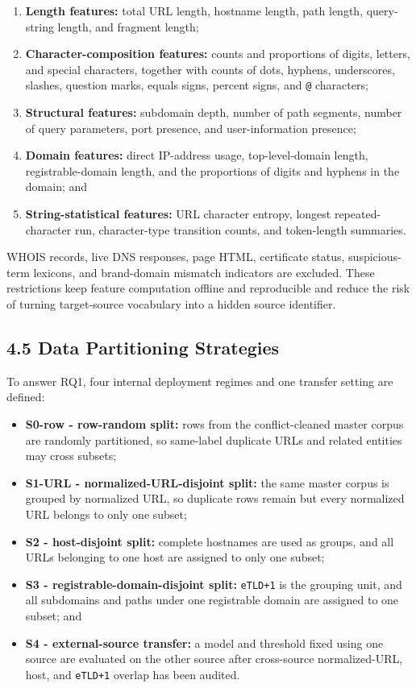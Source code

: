 \documentclass[
  10pt,
]{article}
\providecommand{\tightlist}{%
  \setlength{\itemsep}{0pt}\setlength{\parskip}{0pt}}
\begin{document}
\begin{enumerate}
\def\labelenumi{\arabic{enumi}.}
\tightlist
\item
  \textbf{Length features:} total URL length, hostname length, path
  length, query-string length, and fragment length;
\item
  \textbf{Character-composition features:} counts and proportions of
  digits, letters, and special characters, together with counts of dots,
  hyphens, underscores, slashes, question marks, equals signs, percent
  signs, and \texttt{@} characters;
\item
  \textbf{Structural features:} subdomain depth, number of path
  segments, number of query parameters, port presence, and
  user-information presence;
\item
  \textbf{Domain features:} direct IP-address usage, top-level-domain
  length, registrable-domain length, and the proportions of digits and
  hyphens in the domain; and
\item
  \textbf{String-statistical features:} URL character entropy, longest
  repeated-character run, character-type transition counts, and
  token-length summaries.
\end{enumerate}

WHOIS records, live DNS responses, page HTML, certificate status,
suspicious-term lexicons, and brand-domain mismatch indicators are
excluded. These restrictions keep feature computation offline and
reproducible and reduce the risk of turning target-source vocabulary
into a hidden source identifier.

\subsection{4.5 Data Partitioning
Strategies}\label{data-partitioning-strategies}

To answer RQ1, four internal deployment regimes and one transfer setting
are defined:

\begin{itemize}
\tightlist
\item
  \textbf{S0-row - row-random split:} rows from the conflict-cleaned
  master corpus are randomly partitioned, so same-label duplicate URLs
  and related entities may cross subsets;
\item
  \textbf{S1-URL - normalized-URL-disjoint split:} the same master
  corpus is grouped by normalized URL, so duplicate rows remain but
  every normalized URL belongs to only one subset;
\item
  \textbf{S2 - host-disjoint split:} complete hostnames are used as
  groups, and all URLs belonging to one host are assigned to only one
  subset;
\item
  \textbf{S3 - registrable-domain-disjoint split:} \texttt{eTLD+1} is
  the grouping unit, and all subdomains and paths under one registrable
  domain are assigned to one subset; and
\item
  \textbf{S4 - external-source transfer:} a model and threshold fixed
  using one source are evaluated on the other source after cross-source
  normalized-URL, host, and \texttt{eTLD+1} overlap has been audited.
\end{itemize}
\end{document}
